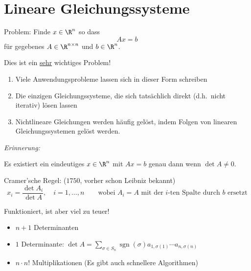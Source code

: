 \chapter{Lineare Gleichungssysteme}

Problem: Finde $x \in \R^n$ so dass
\begin{equation*}
Ax = b
\end{equation*}
für gegebenes $A \in \R^{n\times n}$ und $b\in \R^n$.

\medskip

Dies ist ein \underline{sehr} wichtiges Problem!

\begin{enumerate}[1)]
\item Viele Anwendungsprobleme lassen sich in dieser Form schreiben
\item Die einzigen Gleichungssysteme, die sich tatsächlich direkt (d.h.\ nicht iterativ) lösen lassen
\item Nichtlineare Gleichungen werden häufig gelöst, indem Folgen von linearen Gleichungssystemen gelöst werden.
\end{enumerate}

\bigskip

\emph{Erinnerung:}
\begin{satz}
Es existiert ein eindeutiges $x \in \R^{n}$ mit $Ax = b$ genau dann wenn $\det A \neq 0$.
\end{satz}
Cramer'sche Regel: ($1750$, vorher schon Leibniz bekannt)
\begin{equation*}
x_i
=
\frac{\det A_i}{\det A}, \quad i = 1, \dots, n
\qquad
\text{wobei $A_i = A$ mit der $i$-ten Spalte durch $b$ ersetzt}
\end{equation*}

\medskip

Funktioniert, ist aber viel zu teuer!

\medskip

\begin{itemize}
\item $n+1$ Determinanten
\item $1$ Determinante: $\det A = \sum_{\sigma \in S_n} \operatorname{sgn}(\sigma) a_{1,\sigma(1)} \cdots a_{n,\sigma(n)}$
\item $n \cdot n!$ Multiplikationen (Es gibt auch schnellere Algorithmen)
\end{itemize}

\medskip

